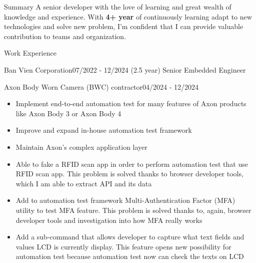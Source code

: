 \documentclass{resume} %
\begin{document}
\begin{rSection}{Summary}
A senior developer with the love of learning and great wealth of knowledge and experience. With \textbf{4+ year} of continuously learning adapt to new technologies and solve new problem, I'm confident that I can provide valuable contribution to teams and organization.
\end{rSection}


\begin{rSection}{Work Experience}
    \begin{rCompanySubsection}{Ban Vien Corporation}{07/2022 - 12/2024 (2.5 year)}
        {Senior Embedded Engineer}
        {}
        \begin{rProjectSubsubsectionV2}{Axon Body Worn Camera (BWC) contractor}{04/2024 - 12/2024}{
            \begin{itemize}
                \item Implement end-to-end automation test for many features of Axon products like Axon Body 3 or Axon Body 4
                \item Improve and expand in-house automation test framework
                \item Maintain Axon's complex application layer
            \end{itemize}
        }{
            \begin{itemize}
                \item Able to fake a RFID scan app in order to perform automation test that use RFID scan app. This problem is solved thanks to browser developer tools, which I am able to extract API and its data
                \item Add to automation test framework Multi-Authentication Factor (MFA) utility to test MFA feature. This problem is solved thanks to, again, browser developer tools and investigation into how MFA really works
                \item Add a sub-command that allows developer to capture what text fields and values LCD is currently display. This feature opens new possibility for automation test because automation test now can check the texts on LCD

\end{itemize}}
\end{rProjectSubsubsectionV2}
\end{rCompanySubsection}
\end{rSection}
\end{document}
